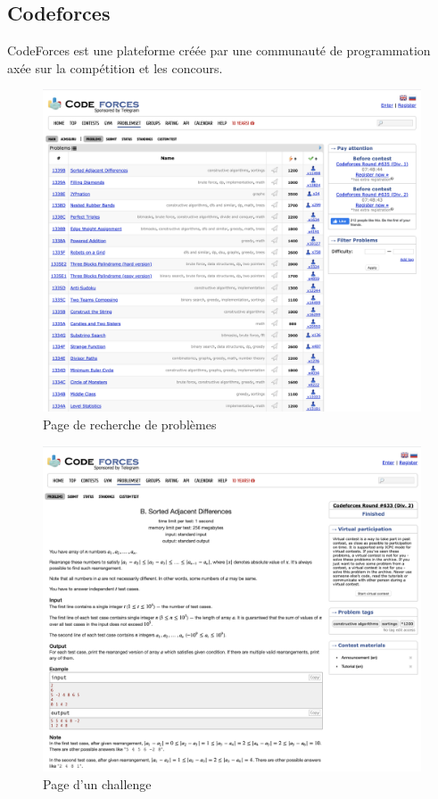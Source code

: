 \pagebreak
\subsection*{Codeforces}

CodeForces est une plateforme créée par une communauté de programmation axée sur la compétition et les concours.

\begin{figure}[H]
    \includegraphics[width=\textwidth,height=0.6\textheight,keepaspectratio]{images/comparison/codeforces-1.png}
    \centering
    \caption[Codeforces : page de recherche de problèmes]{Page de recherche de problèmes}
\end{figure}

\begin{figure}[H]
    \includegraphics[width=\textwidth,height=0.6\textheight,keepaspectratio]{images/comparison/codeforces-2.png}
    \centering
    \caption[Codeforces : page d'un challenge]{Page d'un challenge}
\end{figure}

